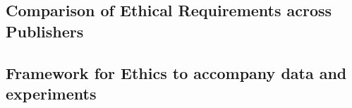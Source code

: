 




\subsection{Comparison of Ethical Requirements across Publishers}

\subsection{Framework for Ethics to accompany data and experiments}


